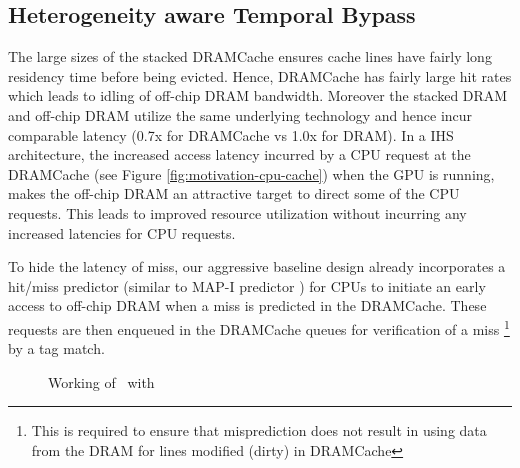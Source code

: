 \subsection{Heterogeneity aware Temporal Bypass} \label{mechanism-bye}
The large sizes of the stacked DRAMCache ensures cache lines have fairly long residency time before being evicted. Hence, DRAMCache has fairly large hit rates which leads to idling of off-chip DRAM bandwidth. Moreover the stacked DRAM and off-chip DRAM utilize the same underlying technology and hence incur comparable latency (0.7x for DRAMCache vs 1.0x for DRAM). 
In a IHS architecture, the increased access latency incurred by a CPU request at the DRAMCache (see Figure \ref{fig:motivation-cpu-cache}) when the GPU is running, makes the off-chip DRAM an attractive target to direct some of the CPU requests. This leads to improved resource utilization without incurring any increased latencies for CPU requests. 
\par To hide the latency of miss, our aggressive baseline design already incorporates a hit/miss predictor (similar to MAP-I predictor \cite{alloy}) for CPUs to initiate an early access to off-chip DRAM when a miss is predicted in the DRAMCache. These requests are then enqueued in the DRAMCache queues for verification of a miss 
\footnote{This is required to ensure that misprediction does not result in using data from the DRAM for lines modified (dirty) in DRAMCache}
by a tag match. 

\begin{figure}[htb]
	\centering
	\scalebox{0.78}{\bloom}
	\caption{Working of \cachename\ with \bypassname}
	\label{fig:bye}
\end{figure}

